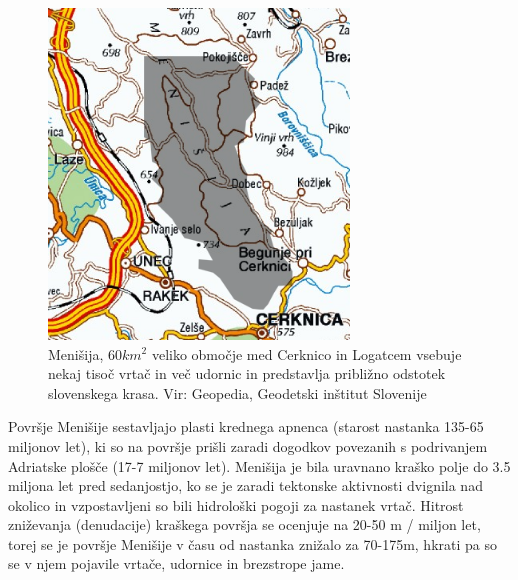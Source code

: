 \documentclass[a4paper, oneside, 12pt]{book}
\begin{document}
\begin{figure}[H]
  \centering
  \includegraphics[width=8cm]{slike/menisija-karta}
  \caption{Menišija, $60 km^2$ veliko območje med Cerknico in Logatcem vsebuje nekaj tisoč vrtač in več udornic in predstavlja približno odstotek slovenskega krasa. Vir: Geopedia, Geodetski inštitut Slovenije}
  \label{fig:menisija-karta}
\end{figure}

Površje Menišije sestavljajo plasti krednega apnenca (starost nastanka 135-65 miljonov let), ki so na površje prišli zaradi dogodkov povezanih s podrivanjem Adriatske plošče (17-7 miljonov let). Menišija je bila uravnano kraško polje do 3.5 miljona let pred sedanjostjo, ko se je zaradi tektonske aktivnosti dvignila nad okolico in vzpostavljeni so bili hidrološki pogoji za nastanek vrtač. Hitrost zniževanja (denudacije) kraškega površja se ocenjuje na 20-50 m / miljon let, torej se je površje Menišije v času od nastanka znižalo za 70-175m, hkrati pa so se v njem pojavile vrtače, udornice in brezstrope jame. \cite{Vrabec2006} \cite{Placer2010}
\end{document}
